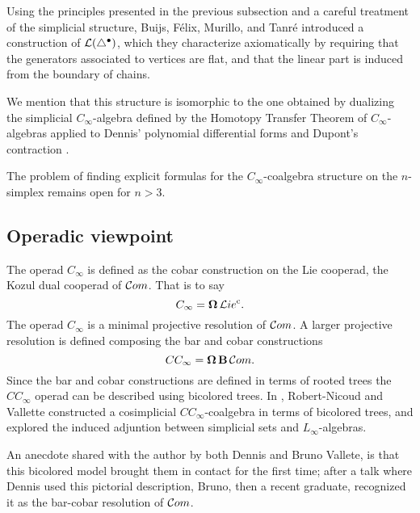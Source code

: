Using the principles presented in the previous subsection and a careful treatment of the simplicial structure, Buijs, F{\'e}lix, Murillo, and Tanr{\'e} \cite{buijs2020liemodels} introduced a construction of $\mathcal{L}(\triangle^\bullet)$, which they characterize axiomatically by requiring that the generators associated to vertices are flat, and that the linear part is induced from the boundary of chains.

We mention that this structure is isomorphic to the one obtained by dualizing the simplicial $C_\infty$-algebra defined by the Homotopy Transfer Theorem of $C_\infty$-algebras applied to Dennis' polynomial differential forms and Dupont's contraction \cite{getzler2008transfering}.

The problem of finding explicit formulas for the $C_\infty$-coalgebra structure on the $n$-simplex remains open for $n > 3$.

\subsection{Operadic viewpoint}

The operad $C_\infty$ is defined as the cobar construction on the Lie cooperad, the Kozul dual cooperad of $\mathcal{C}om$.
That is to say
\[
C_\infty = \operatorname{\mathbf{\Omega}} \mathcal{L}ie^{\mathrm{c}}.
\]
The operad $C_\infty$ is a minimal projective resolution of $\mathcal{C}om$.
A larger projective resolution is defined composing the bar and cobar constructions
\[
CC_\infty = \operatorname{\mathbf{\Omega}} \operatorname{\mathbf{B}} \mathcal{C}om.
\]
Since the bar and cobar constructions are defined in terms of rooted trees the $CC_\infty$ operad can be described using bicolored trees.
In \cite{vallette2020higherlietheory}, Robert-Nicoud and Vallette constructed a cosimplicial $CC_\infty$-coalgebra in terms of bicolored trees, and explored the induced adjuntion between simplicial sets and $L_\infty$-algebras.

An anecdote shared with the author by both Dennis and Bruno Vallete, is that this bicolored model brought them in contact for the first time; after a talk where Dennis used this pictorial description, Bruno, then a recent graduate, recognized it as the bar-cobar resolution of $\mathcal{C}om$.